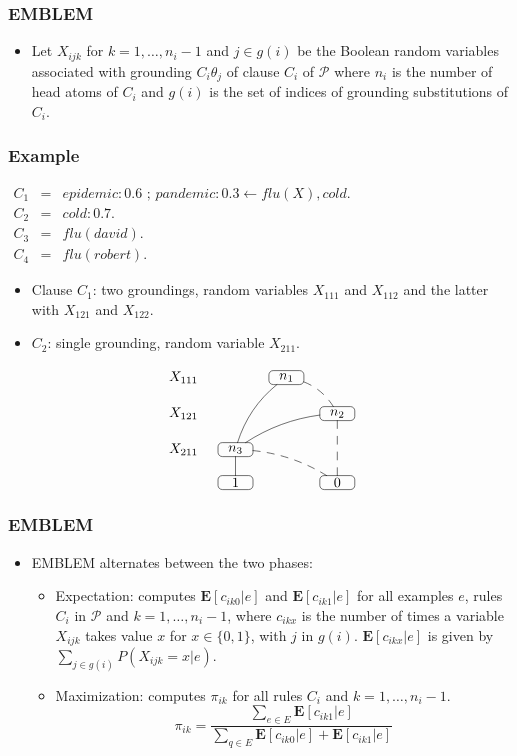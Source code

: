 \documentclass[trans,aspectratio=1610]{beamer}
\newcommand\orh{\mbox{ ; }}
\newcommand{\defpprog}{\ensuremath{\mathcal{P}}\xspace}
\newcommand{\lpif}{\leftarrow}
\begin{document}
\begin{frame}
 \frametitle{EMBLEM}
  \begin{itemize}
\item Let $X_{ijk}$ for $k=1,\ldots,n_i-1$ and $j\in g(i)$ be the Boolean random variables associated with grounding 
$C_i\theta_j$ of clause $C_i$ of $\defpprog$ where $n_i$ is the number of head atoms of $C_i$ and $g(i)$ is the set
of indices of grounding substitutions of $C_i$.
		\end{itemize}
\end{frame}
\begin{frame}
 \frametitle{Example}
 
$
 \begin{array}{lllllll}
C_1&=&epidemic:0.6\orh  pandemic :0.3\lpif flu(X),cold.\\
C_2&=&cold:0.7. \\
C_3&=&flu(david).\\
C_4&=&flu(robert).
 \end{array}$
\begin{itemize}
\item
Clause $C_1$: two groundings,  random variables $X_{111}$ and $X_{112}$ and the latter with $X_{121}$ and $X_{122}$.
 \item
 $C_2$:  single grounding, random variable
 $X_{211}$.
 \end{itemize}
 \begin{scriptsize}
	{
	$$
\xymatrix@=4mm
{ X_{111} & &*=<25pt,10pt>[F-:<3pt>]{n_1}
\ar@/_/@{-}[ldd] \ar@/^/@{--}[dr]\\ 
X_{121}  &&&*=<25pt,10pt>[F-:<3pt>]{n_2} 
\ar@/_/@{-}[dll]\ar@{--}[dd] 
\\
X_{211}& *=<25pt,10pt>[F-:<3pt>]{n_3}
\ar@{-}[d] \ar@/^/@{--}[drr]  && \\
&*=<25pt,10pt>[F-:<3pt>]{1} &&*=<25pt,10pt>[F-:<3pt>]{0}}
$$
}	
 \end{scriptsize}
\end{frame}
\begin{frame}
 \frametitle{EMBLEM}

  \begin{itemize}
\item 
EMBLEM alternates between the two phases:
\begin{itemize}
\item 
Expectation:
computes $\mathbf{E}[c_{ik0}|e]$ and $\mathbf{E}[c_{ik1}|e]$ for all examples $e$, rules $C_i$ in $\defpprog$ and $k=1,\ldots,n_i-1$, where $c_{ikx}$ is the number of times a variable $X_{ijk}$ takes value $x$ for $x\in \{0,1\}$, with $j$ in $g(i)$.
$\mathbf{E}[c_{ikx}|e]$ is given by $\sum_{j\in g(i)}P(X_{ijk}=x|e).$
\item
Maximization: computes $\pi_{ik}$ for all rules $C_i$ and $k=1,\ldots,n_i-1$.
$$\pi_{ik}=\frac{\sum_{e\in E}\mathbf{E}[c_{ik1}|e]}{\sum_{q\in E}\mathbf{E}[c_{ik0}|e]+\mathbf{E}[c_{ik1}|e]}$$
\end{itemize}
\end{itemize}
\end{frame}
\end{document}
